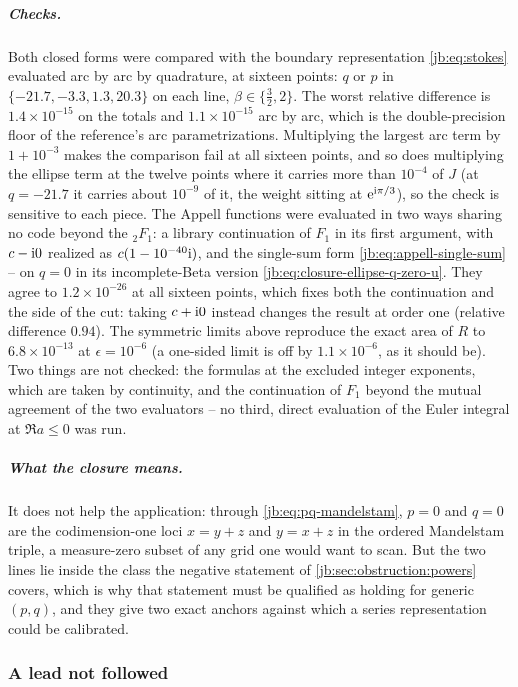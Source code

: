 \subparagraph{Checks.}
Both closed forms were compared with the boundary representation \eqref{jb:eq:stokes} evaluated arc
by arc by quadrature, at sixteen points: $q$ or $p$ in $\{ -21.7, -3.3, 1.3, 20.3 \}$ on each
line, $\beta \in \{ \tfrac32, 2 \}$.
The worst relative difference is $1.4 \times 10^{-15}$ on the totals and $1.1 \times 10^{-15}$ arc
by arc, which is the double-precision floor of the reference's arc parametrizations.
Multiplying the largest arc term by $1 + 10^{-3}$ makes the comparison fail at all sixteen points,
and so does multiplying the ellipse term at the twelve points where it carries more than $10^{-4}$
of $J$ (at $q = -21.7$ it carries about $10^{-9}$ of it, the weight sitting at $\mathrm{e}^{\mathrm{i} \pi/3}$), so
the check is sensitive to each piece.
The Appell functions were evaluated in two ways sharing no code beyond the ${}_2F_1$: a library
continuation of $F_1$ in its first argument, with $c - \mathrm{i} 0$ realized as $c (1 - 10^{-40} \mathrm{i})$,
and the single-sum form \eqref{jb:eq:appell-single-sum} -- on $q = 0$ in its incomplete-Beta version
\eqref{jb:eq:closure-ellipse-q-zero-u}.
They agree to $1.2 \times 10^{-26}$ at all sixteen points, which fixes both the continuation and
the side of the cut: taking $c + \mathrm{i} 0$ instead changes the result at order one (relative
difference $0.94$).
The symmetric limits above reproduce the exact area of $R$ to $6.8 \times 10^{-13}$ at
$\epsilon = 10^{-6}$ (a one-sided limit is off by $1.1 \times 10^{-6}$, as it should be).
Two things are not checked: the formulas at the excluded integer exponents, which are taken by
continuity, and the continuation of $F_1$ beyond the mutual agreement of the two evaluators -- no
third, direct evaluation of the Euler integral at $\Re a \le 0$ was run.

\subparagraph{What the closure means.}
It does not help the application: through \eqref{jb:eq:pq-mandelstam}, $p = 0$ and $q = 0$ are the
codimension-one loci $x = y + z$ and $y = x + z$ in the ordered Mandelstam triple, a measure-zero
subset of any grid one would want to scan.
But the two lines lie inside the class the negative statement of \cref{jb:sec:obstruction:powers}
covers, which is why that statement must be qualified as holding for generic $(p, q)$, and they
give two exact anchors against which a series representation could be calibrated.



\subsubsection{A lead not followed}
\label{jb:sec:obstruction:lead}

